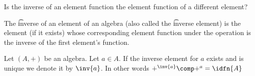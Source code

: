 

Is the inverse of an element function the element function of a different element?


The \t{inverse} of an element of an algebra (also called the \t{inverse element}) is the element (if it exists) whose corresponding element function under the operation is the inverse of the first element's function.


Let $(A, +)$ be an algebra.
Let $a \in A$.
If the inverse element for $a$ exists and is unique we denote it by $\inv{a}$.
In other words $+^{\inv{a}} \comp +^{a} = \idfn{A}$

\blankpage
